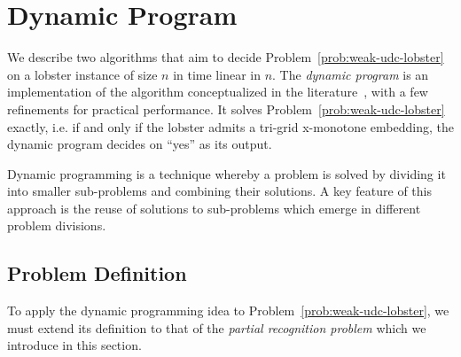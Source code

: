 \chapter{Dynamic Program}
\label{ch:dynprog}

We describe two algorithms that aim to decide Problem~\ref{prob:weak-udc-lobster} on a lobster instance of size $n$ in time linear in $n$. The \emph{dynamic program} is an implementation of the algorithm conceptualized in the literature~\cite{Bhore2021}, with a few refinements for practical performance. It solves Problem~\ref{prob:weak-udc-lobster} exactly, i.e. if and only if the lobster admits a tri-grid x-monotone embedding, the dynamic program decides on ``yes'' as its output.

Dynamic programming is a technique whereby a problem is solved by dividing it into smaller sub-problems and combining their solutions.
A key feature of this approach is the reuse of solutions to sub-problems which emerge in different problem divisions.


\section{Problem Definition}
\label{section:ch4-probdef}
To apply the dynamic programming idea to Problem~\ref{prob:weak-udc-lobster}, we must extend its definition to that of the \emph{partial recognition problem} which we introduce in this section.


